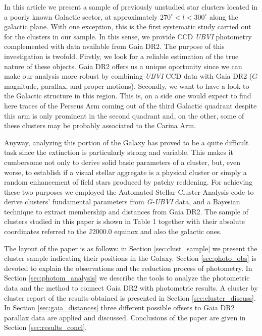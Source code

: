 \documentclass[draft]{aa}
\begin{document}
In this article we present a sample of previously unstudied star clusters
located in a poorly known Galactic sector, at approximately
$270^\circ<l<300^\circ$ along the galactic plane. With one exception, this is
the first systematic study carried out for the clusters in our sample. In this
sense, we provide CCD \textit{UBVI} photometry complemented with data available
from Gaia DR2. The purpose of this investigation is twofold. Firstly, we look
for a reliable estimation of the true nature of these objects. Gaia DR2 offers
us a unique oportunity since we can make our analysis more robust by combining 
\textit{UBVI} CCD data with Gaia DR2 ($G$ magnitude, parallax, and proper
motions). Secondly, we want to have a look to the Galactic structure in this
region. This is, on a side one would expect to find here traces of the Perseus
Arm coming out of the third Galactic quadrant despite this arm is only
prominent in the second quadrant and, on the other, some of these clusters may
be probably associated to the Carina Arm. 

Anyway, analyzing this portion of the Galaxy has proved to be a quite difficult
task since the extinction is particularly strong and variable. This
makes it cumbersome not only to derive solid basic parameters of a cluster,
but, even worse, to establish if a visual stellar aggregate is a physical
cluster or simply a random enhancement of field stars produced by patchy
reddening. 
%
For achieving these two purposes we employed the Automated Stellar
Cluster Analysis code \citep[\texttt{ASteCA};][]{Perren_2015} to derive
clusters' fundamental parameters from \textit{G-UBVI} data, and a Bayesian
technique to extract membership and distances from Gaia DR2. The sample of
clusters studied in this paper is shown in Table 1 together with their absolute
coordinates referred to the J2000.0 equinox and also the galactic ones.

The layout of the paper is as follows: in Section \ref{sec:clust_sample} we
present the cluster sample indicating their positions in the Galaxy.
Section \ref{sec:photo_obs} is devoted to explain the observations and the
reduction process of photometry. In Section \ref{sec:photom_analysis} we
describe the tools to analyze the photometric data and the method to connect
Gaia DR2 with photometric results. A cluster by cluster report of the results
obtained is presented in Section \ref{sec:cluster_discuss}. In Section
\ref{sec:gaia_distances} three different possible offsets to Gaia DR2 parallax
data are applied and discussed. Conclusions of the paper are given in Section 
\ref{sec:results_concl}.
\end{document}
